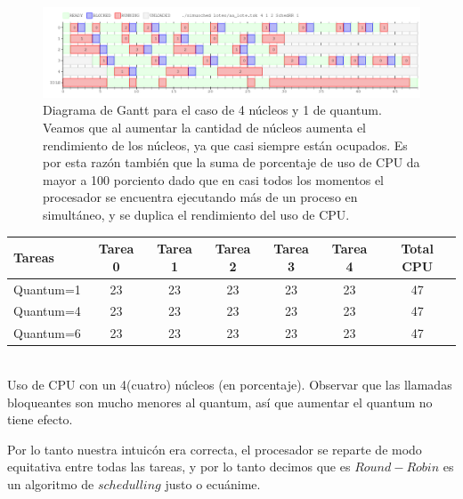 \begin{figure}[H]
	\includegraphics[scale=0.49]{ej7/ej7_4_1.png}
	\caption{Diagrama de Gantt para el caso de 4 núcleos y 1 de quantum. Veamos que al aumentar la cantidad de núcleos aumenta el rendimiento de los núcleos, ya que casi siempre están ocupados. Es por esta razón también que la suma de porcentaje de uso de CPU da mayor a 100 porciento dado que en casi todos los momentos el procesador se encuentra ejecutando más de un proceso en simultáneo, y se duplica el rendimiento del uso de CPU.}
\end{figure}

\begin{center}
  \begin{tabular}{ |l | c | c | c | c| c | c| }
    \hline
    Tareas    & Tarea 0 & Tarea 1 & Tarea 2 & Tarea 3 & Tarea 4 & Total CPU  \\ \hline
    Quantum=1 & 23      & 23      & 23      & 23     & 23 &  47       \\ \hline
    Quantum=4 & 23    & 23    & 23    & 23   & 23 &  47        \\ \hline
    Quantum=6 & 23   & 23   & 23   & 23   & 23 &  47        \\ \hline
  \end{tabular} \\ \vspace{10pt} 
  Uso de CPU con un 4(cuatro) núcleos (en porcentaje). Observar que las llamadas bloqueantes son mucho menores al quantum, así que aumentar el quantum no tiene efecto.
\end{center}

Por lo tanto nuestra intuicón era correcta, el procesador se reparte de modo equitativa entre todas las tareas, y por lo tanto decimos que es $Round-Robin$ es un algoritmo de $schedulling$ justo o ecuánime.
% 
% 
% 


